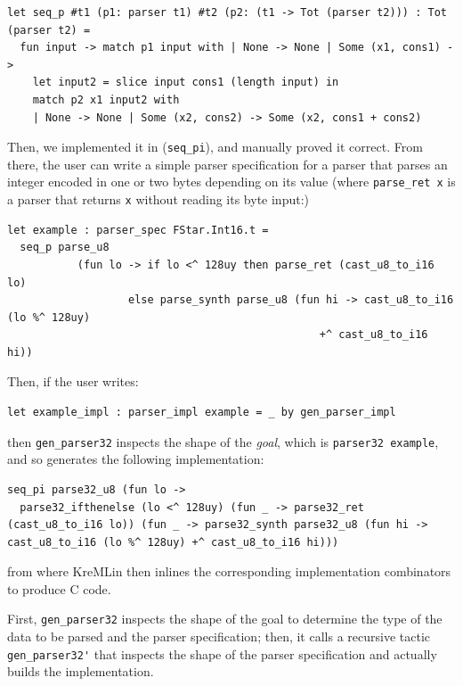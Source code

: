 \begin{lstlisting}
let seq_p #t1 (p1: parser t1) #t2 (p2: (t1 -> Tot (parser t2))) : Tot (parser t2) =
  fun input -> match p1 input with | None -> None | Some (x1, cons1) ->
    let input2 = slice input cons1 (length input) in
    match p2 x1 input2 with
    | None -> None | Some (x2, cons2) -> Some (x2, cons1 + cons2)
\end{lstlisting}

Then, we implemented it in \lowstar (\verb+seq_pi+), and
manually proved it correct. From there, the user can write a simple
parser specification for a parser that parses an integer encoded
in one or two bytes depending on its value (where \verb+parse_ret x+
is a parser that returns \verb+x+ without reading its byte input:)

\begin{lstlisting}
let example : parser_spec FStar.Int16.t =
  seq_p parse_u8
           (fun lo -> if lo <^ 128uy then parse_ret (cast_u8_to_i16 lo)
                   else parse_synth parse_u8 (fun hi -> cast_u8_to_i16 (lo %^ 128uy)
                                                 +^ cast_u8_to_i16 hi))
\end{lstlisting}
%
Then, if the user writes:
%
\begin{lstlisting}
let example_impl : parser_impl example = _ by gen_parser_impl
\end{lstlisting}
%
then \verb+gen_parser32+ inspects the shape of the \emph{goal},
which is \verb+parser32 example+, and so generates the following \lowstar implementation:
%
\begin{lstlisting}
seq_pi parse32_u8 (fun lo ->
  parse32_ifthenelse (lo <^ 128uy) (fun _ -> parse32_ret (cast_u8_to_i16 lo)) (fun _ -> parse32_synth parse32_u8 (fun hi -> cast_u8_to_i16 (lo %^ 128uy) +^ cast_u8_to_i16 hi)))
\end{lstlisting}

from where KreMLin \cite{lowstar} then inlines the corresponding implementation combinators to produce C code.

First, \verb+gen_parser32+ inspects the shape of the goal to determine
the type of the data to be parsed and the parser specification; then,
it calls a recursive tactic \verb+gen_parser32'+ that inspects the
shape of the parser specification and actually builds the
implementation.

